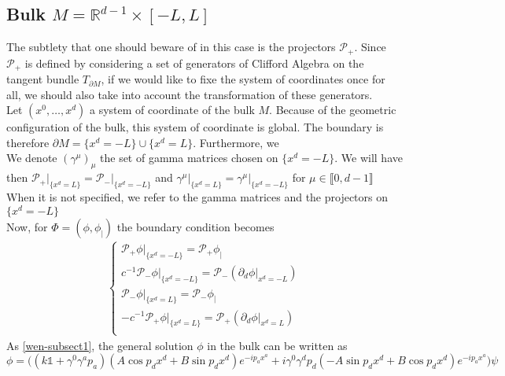 \subsection{Bulk $M = \mathbb{R}^{d-1} \times [-L, L]$ }\label{wen-subsect-saw2}
The subtlety that one should beware of in this case is the projectors $\mathcal{P}_+$.
Since $\mathcal{P}_+$ is defined by considering a set of generators of Clifford Algebra on the tangent bundle $T_{ \partial M}$, 
if we would like to fixe the system of coordinates once for all,
we should also take into account the transformation of these generators. \\
Let $(x^0, \ldots, x^d)$ a system of coordinate of the bulk $M$. 
Because of the geometric configuration of the bulk, 
this system of coordinate is global. 
The boundary is therefore $\partial M = \{x^d = -L \} \cup \{ x^d = L \}$.
Furthermore, we  \\
We denote $(\gamma^\mu)_\mu$ the set of gamma matrices chosen on $\{x^d  = - L \}$. 
We will have then $\mathcal{P}_+\vert_{\{x^d = L\}} = \mathcal{P}_-\vert_{\{x^d = -L\}}$ and $\gamma^\mu\vert_{\{x^d = L\}}=\gamma^\mu\vert_{\{x^d = -L\}}$ for $\mu\in\llbracket 0, d-1 \rrbracket$
When it is not specified, we refer to the gamma matrices and the projectors on $\{x^d = -L\}$ \\
Now, for $\Phi = (\phi, \phi_|)$ the boundary condition becomes
\begin{equation}\label{wen-saw2bound}
\begin{split}
\begin{cases}
\mathcal{P}_+ \phi\vert_{\{x^d = -L\}} = \mathcal{P}_+\phi_| \\
c^{-1}\mathcal{P}_-\phi\vert_{\{x^d = -L\}} = \mathcal{P}_-(\partial_d \phi\vert_{x^d = -L}) \\
\mathcal{P}_- \phi\vert_{\{x^d = L\}} = \mathcal{P}_-\phi_| \\
-c^{-1}\mathcal{P}_+\phi\vert_{\{x^d = L\}} = \mathcal{P}_+(\partial_d \phi\vert_{x^d = L}) \\
\end{cases}
\end{split}
\end{equation}
As \cref{wen-subsect1}, the general solution $\phi$ in the bulk can be written as
\begin{equation*}
\phi 
 =\Big( (k \mathbb{1}+ \gamma^0\gamma^a p_a )(A \cos p_d x^d + B \sin p_d x^d)e^{-ip_a x^a}
+ i\gamma^0\gamma^d p_d (-A \sin p_d x^d + B \cos p_d x^d) e^{-ip_a x^a} \Big) \psi
 \end{equation*}
